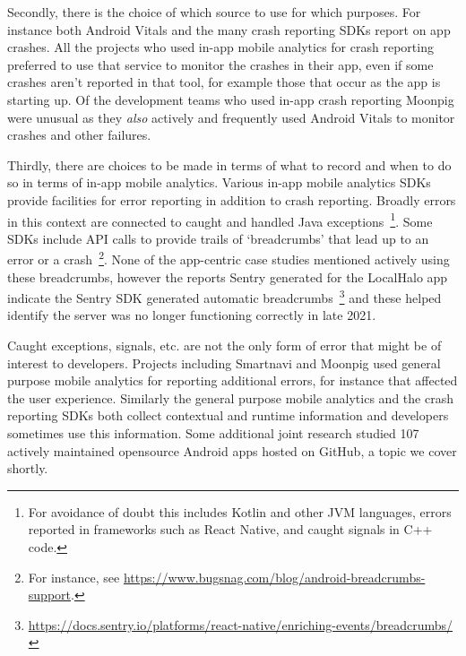 Secondly, there is the choice of which source to use for which purposes. For instance both Android Vitals and the many crash reporting SDKs report on app crashes. All the projects who used in-app mobile analytics for crash reporting preferred to use that service to monitor the crashes in their app, even if some crashes aren't reported in that tool, for example those that occur as the app is starting up. Of the development teams who used in-app crash reporting Moonpig were unusual as they \textit{also} actively and frequently used Android Vitals to monitor crashes and other failures.

Thirdly, there are choices to be made in terms of what to record and when to do so in terms of in-app mobile analytics. Various in-app mobile analytics SDKs provide facilities for error reporting in addition to crash reporting. Broadly errors in this context are connected to caught and handled Java exceptions~\footnote{For avoidance of doubt this includes Kotlin and other JVM languages, errors reported in frameworks such as React Native, and caught signals in C++ code.}. Some SDKs include API calls to provide trails of `breadcrumbs' that lead up to an error or a crash~\footnote{For instance, see \url{https://www.bugsnag.com/blog/android-breadcrumbs-support}.}. None of the app-centric case studies mentioned actively using these breadcrumbs, however the reports Sentry generated for the LocalHalo app indicate the Sentry SDK generated automatic breadcrumbs~\footnote{\url{https://docs.sentry.io/platforms/react-native/enriching-events/breadcrumbs/}} and these helped identify the server was no longer functioning correctly in late 2021. 


Caught exceptions, signals, etc. are not the only form of error that might be of interest to developers. Projects including Smartnavi and Moonpig used general purpose mobile analytics for reporting additional errors, for instance that affected the user experience. Similarly the general purpose mobile analytics and the crash reporting SDKs both collect contextual and runtime information and developers sometimes use this information. Some additional joint research studied 107 actively maintained opensource Android apps hosted on GitHub, a topic we cover shortly.

